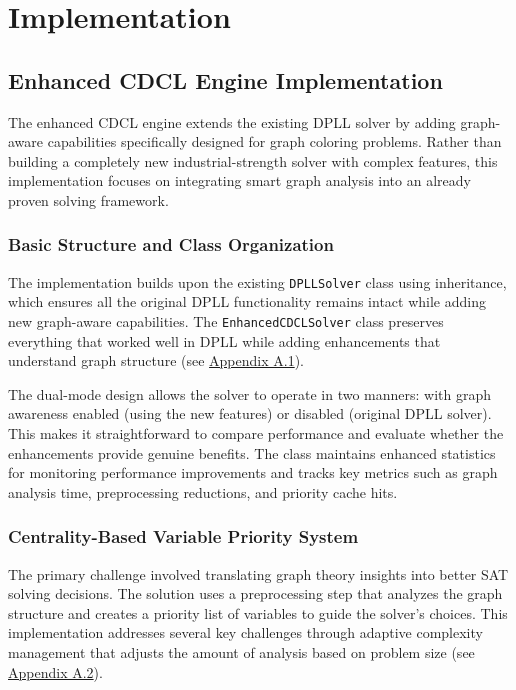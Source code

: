 \section{Implementation}

\subsection{Enhanced CDCL Engine Implementation}

The enhanced CDCL engine extends the existing DPLL solver by adding graph-aware capabilities specifically designed for graph coloring problems. Rather than building a completely new industrial-strength solver with complex features, this implementation focuses on integrating smart graph analysis into an already proven solving framework.

\subsubsection{Basic Structure and Class Organization}

The implementation builds upon the existing \texttt{DPLLSolver} class using inheritance, which ensures all the original DPLL functionality remains intact while adding new graph-aware capabilities. The \texttt{Enhanced\-CDCL\-Solver} class preserves everything that worked well in DPLL while adding enhancements that understand graph structure (see \hyperref[appendix:enhanced-cdcl-class]{Appendix A.1}).

The dual-mode design allows the solver to operate in two manners: with graph awareness enabled (using the new features) or disabled (original DPLL solver). This makes it straightforward to compare performance and evaluate whether the enhancements provide genuine benefits. The class maintains enhanced statistics for monitoring performance improvements and tracks key metrics such as graph analysis time, preprocessing reductions, and priority cache hits.

\subsubsection{Centrality-Based Variable Priority System}

The primary challenge involved translating graph theory insights into better SAT solving decisions. The solution uses a preprocessing step that analyzes the graph structure and creates a priority list of variables to guide the solver's choices. This implementation addresses several key challenges through adaptive complexity management that adjusts the amount of analysis based on problem size (see \hyperref[appendix:centrality-priority]{Appendix A.2}).

